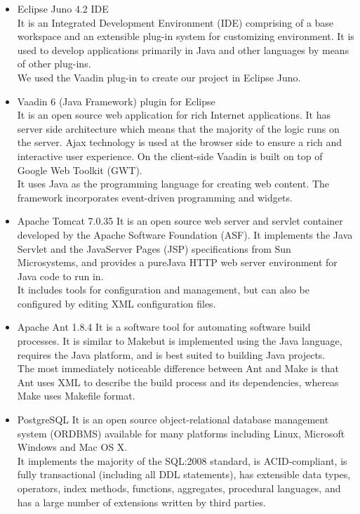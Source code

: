 \documentclass[amsart, 12pt]{article}
\begin{document}
\begin{itemize}
\item Eclipse Juno 4.2 IDE \\
It is an Integrated Development Environment (IDE) comprising of a base workspace and an extensible plug-in system for customizing environment. It is used to develop applications primarily in Java and other languages by means of other plug-ins.\\
We used the Vaadin plug-in to create our project in Eclipse Juno.

\item Vaadin 6 (Java Framework) plugin for Eclipse \\
It is an open source web application for rich Internet applications. It has server side architecture which means that the majority of the logic runs on the server. Ajax technology is used at the browser side to ensure a rich and interactive user experience. On the client-side Vaadin is built on top of Google Web Toolkit (GWT).\\
It uses Java as the programming language for creating web content. The framework incorporates event-driven programming and widgets.

\item Apache Tomcat 7.0.35
It is an open source web server and servlet container developed by the Apache Software Foundation (ASF). It implements the Java Servlet and the JavaServer Pages (JSP) specifications from Sun Microsystems, and provides a \textgravedbl pure\textacutedbl Java HTTP web server environment for Java code to run in. \\
It includes tools for configuration and management, but can also be configured by editing XML configuration files.

\item Apache Ant 1.8.4
It is a software tool for automating software build processes. It is similar to \textasciigrave Make\textasciiacute but is implemented using the Java language, requires the Java platform, and is best suited to building Java projects.\\
The most immediately noticeable difference between Ant and Make is that Ant uses XML to describe the build process and its dependencies, whereas Make uses Makefile format.

\item PostgreSQL
It is an open source object-relational database management system (ORDBMS) available for many platforms including Linux, Microsoft Windows and Mac OS X. \\
It implements the majority of the SQL:2008 standard, is ACID-compliant, is fully transactional (including all DDL statements), has extensible data types, operators, index methods, functions, aggregates, procedural languages, and has a large number of extensions written by third parties.


\end{itemize}
\end{document}
